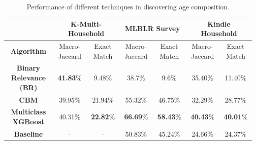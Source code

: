 \begin{table}[]
\setlength{\belowcaptionskip}{-10pt}
\small
\centering
\begin{tabular}{|c|c|c|c|c|c|c|}
\hline
\textbf{}                      & \multicolumn{2}{c|}{\textbf{K-Multi-Household}} & \multicolumn{2}{c|}{\textbf{MLBLR Survey}} & \multicolumn{2}{c|}{\textbf{Kindle Household}} \\ \hline
\textbf{Algorithm}             & Macro-Jaccard          & Exact Match          & Macro-Jaccard         & Exact Match        & Macro-Jaccard           & Exact Match          \\ \hline
\textbf{Binary Relevance (BR)} & \textbf{41.83}\%                & 9.48\%               & 38.7\%               & 9.6\%             & 35.40\%                 & 11.40\%              \\ \hline
\textbf{CBM}                   & 39.95\%                & 21.94\%              & 55.32\%               & 46.75\%            & 32.29\%                 & 28.77\%              \\ \hline
\textbf{Multiclass XGBoost}            & 40.31\%                & \textbf{22.82}\%              & \textbf{66.69}\%               & \textbf{58.43}\%            & \textbf{40.43}\%                 & \textbf{40.01}\%              \\ \hline
\textbf{Baseline}              & -                      & -                    & 50.83\%               & 45.24\%            & 24.66\%                 & 24.37\%              \\ \hline
\end{tabular}
\caption{Performance of different techniques in discovering age composition.}
\label{table:performance-age}
\end{table}
%
%
%
%
